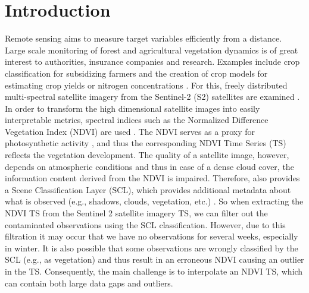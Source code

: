 \chapter{Introduction}

Remote sensing aims to measure target variables efficiently from a distance. 
Large scale monitoring of forest and agricultural vegetation dynamics is of great interest to authorities, insurance companies and research. Examples include crop classification for subsidizing farmers \citep{henitsSentinel2EnablesNationwide2022} and the creation of crop models for estimating crop yields or nitrogen concentrations \citep{couraultSTICSCropModel2021,perichCropNitrogenRetrieval2021}. 
For this, freely distributed multi-spectral satellite imagery from the  Sentinel-2 (S2) satellites are examined \citep{esaSentinel22022}.
In order to transform the high dimensional satellite images into easily interpretable metrics, spectral indices such as the Normalized Difference Vegetation Index (NDVI) are used \citep{rouseMonitoringVernalAdvancement1974}. The NDVI serves as a proxy for photosynthetic activity \citep{gamonRelationshipsNDVICanopy1995a}, and thus the corresponding {NDVI Time Series ({TS})} reflects the vegetation development. 
The quality of a satellite image, however, depends on atmospheric conditions and thus in case of a dense cloud cover, the information content derived from the NDVI is impaired. Therefore, \cite{esaEuropeanSpaceAgency2022} also provides a Scene Classification Layer (SCL), which provides additional metadata about what is observed (e.g., shadows, clouds, vegetation, etc.) . So when extracting the NDVI {TS} from the Sentinel 2 satellite imagery {TS}, we can filter out the contaminated observations using the SCL classification. However, due to this filtration it may occur that we have no observations for several weeks, especially in winter. It is also possible that some observations are wrongly classified by the SCL (e.g., as vegetation) and thus result in an erroneous NDVI causing an outlier in the TS. Consequently, the main challenge is to interpolate an NDVI {TS}, which can contain both large data gaps and outliers. 

